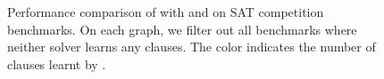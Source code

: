 \begin{figure}[!t]
\begin{subfigure}[t]{0.45\textwidth}
        \label{subfig:cautical-vs-prelearn-performance}
    \end{subfigure}
    \caption{Performance comparison of \tool with \prelearn and \cadical on SAT competition benchmarks. On each graph, we filter out all benchmarks where neither solver learns any \pr clauses. The color indicates the number of \pr clauses learnt by \tool.}
    \label{fig:solver-comparison}
\end{figure}

